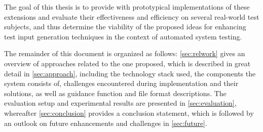 The goal of this thesis is to provide \xmlmate with prototypical implementations of these extensions and
evaluate their effectiveness and efficiency on several real-world test subjects, and thus determine the
viability of the proposed ideas for enhancing test input generation techniques in the context of automated system testing.


The remainder of this document is organized as follows: \cref{sec:relwork} gives an overview of approaches
related to the one proposed, which is described in great detail in \cref{sec:approach}, including the
technology stack used, the components the system consists of, challenges encountered during implementation and
their solutions, as well as guidance function and file format descriptions. The evaluation setup and
experimental results are presented in \cref{sec:evaluation}, whereafter \cref{sec:conclusion} provides a
conclusion statement, which is followed by an outlook on future enhancements and challenges in
\cref{sec:future}.
